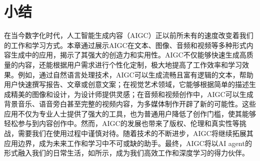 \section{小结}

在当今数字化时代，人工智能生成内容（AIGC）正以前所未有的速度改变着我们的工作和学习方式。本章通过展示AIGC在文本、图像、音频和视频等多种形式内容生成中的应用，揭示了其强大的创造力和实用性。AIGC不仅能够快速生成高质量的内容，还能根据用户需求进行个性化定制，极大地提高了工作效率和学习效果。例如，通过自然语言处理技术，AIGC可以生成流畅且富有逻辑的文本，帮助用户快速撰写报告、文章或创意文案；在视觉艺术领域，它能够根据简单的描述生成精美的图像和设计，为设计师提供灵感；在音频和视频创作中，AIGC可以生成背景音乐、语音旁白甚至完整的视频内容，为多媒体制作开辟了新的可能性。这些应用不仅为专业人士提供了强大的工具，也为普通用户降低了创作门槛，使其能够轻松参与到内容创作中。然而，AIGC的发展也带来了版权、伦理和真实性等挑战，需要我们在使用过程中谨慎对待。随着技术的不断进步，AIGC将继续拓展其应用边界，成为未来工作和学习中不可或缺的助手。最终，AIGC将以AI agent的形式融入我们的日常生活，如所示，成为我们高效工作和深度学习的得力伙伴。


